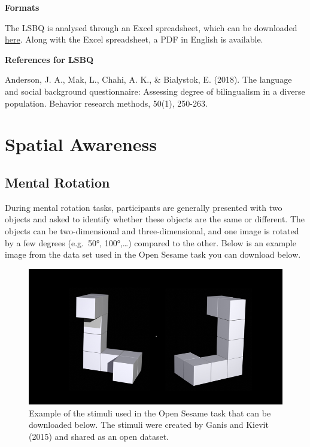 \documentclass[
]{book}
\begin{document}
\textbf{Formats}

The LSBQ is analysed through an Excel spreadsheet, which can be downloaded \href{https://figshare.com/articles/The_Language_and_Social_Background_Questionnaire_Assessing_Degree_of_Bilingualism_in_a_Diverse_Population_Supplementary_Materials/3972486}{here}. Along with the Excel spreadsheet, a PDF in English is available.

\textbf{References for LSBQ}

Anderson, J. A., Mak, L., Chahi, A. K., \& Bialystok, E. (2018). The language and social background questionnaire: Assessing degree of bilingualism in a diverse population. Behavior research methods, 50(1), 250-263.

\hypertarget{spatial-awareness}{%
\chapter{Spatial Awareness}\label{spatial-awareness}}

\hypertarget{mental-rotation}{%
\section{Mental Rotation}\label{mental-rotation}}

During mental rotation tasks, participants are generally presented with two objects and asked to identify whether these objects are the same or different. The objects can be two-dimensional and three-dimensional, and one image is rotated by a few degrees (e.g.~50°, 100°,\ldots) compared to the other. Below is an example image from the data set used in the Open Sesame task you can download below.

\begin{figure}

{\centering \includegraphics[width=0.75\linewidth]{images/RotationExample} 

}

\caption{Example of the stimuli used in the Open Sesame task that can be downloaded below. The stimuli were created by Ganis and Kievit (2015) and shared as an open dataset.}\label{fig:Figure5-1}
\end{figure}
\end{document}

